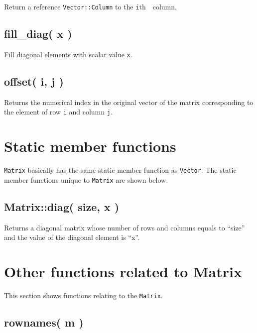 \documentclass[
]{book}
\begin{document}
Return a reference \texttt{Vector::Column} to the \texttt{i}th　column.

\hypertarget{fill_diag-x}{%
\subsection{fill\_diag( x )}\label{fill_diag-x}}

Fill diagonal elements with scalar value \texttt{x}.

\hypertarget{offset-i-j}{%
\subsection{offset( i, j )}\label{offset-i-j}}

Returns the numerical index in the original vector of the matrix corresponding to the element of row \texttt{i} and column \texttt{j}.

\hypertarget{static-member-functions}{%
\section{Static member functions}\label{static-member-functions}}

\texttt{Matrix} basically has the same static member function as \texttt{Vector}. The static member functions unique to \texttt{Matrix} are shown below.

\hypertarget{matrixdiag-size-x}{%
\subsection{Matrix::diag( size, x )}\label{matrixdiag-size-x}}

Returns a diagonal matrix whose number of rows and columns equals to ``size'' and the value of the diagonal element is ``x''.

\hypertarget{other-functions-related-to-matrix}{%
\section{Other functions related to Matrix}\label{other-functions-related-to-matrix}}

This section shows functions relating to the \texttt{Matrix}.

\hypertarget{rownames-m}{%
\subsection{rownames( m )}\label{rownames-m}}
\end{document}
